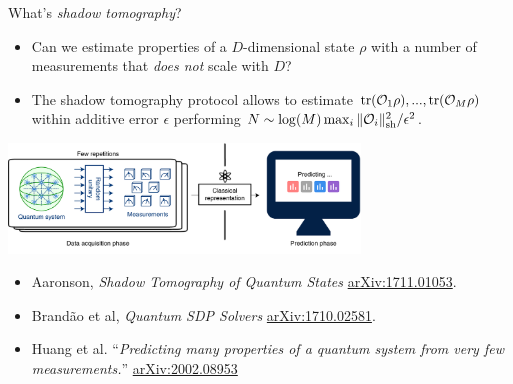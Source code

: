 \documentclass{beamer}
\begin{document}
\begin{frame}{What's \textit{shadow tomography}?}

    \begin{itemize}\small\setlength\itemsep{1em}
        \item \colorbox{orange!20}{\parbox[t]{\dimexpr\linewidth-2\fboxsep}{%
        Can we estimate properties of a $D$-dimensional state $\rho$ with a number of measurements that \textit{does not} scale with $D$?}}
        \item {\color{green!45!black} The shadow tomography protocol allows to estimate $\trace(\mathcal O_1\rho),...,\trace(\mathcal O_M\rho)$ within additive error $\epsilon$ performing $N\sim \log(M) \max_i \|\mathcal O_i\|_{\rm sh}^2/\epsilon^2$.}
    \end{itemize}

    \begin{center}
    \includegraphics[width=0.7\textwidth]{figures/shadowtomographyscheme_concise.png}
    \end{center}
    \vspace{1cm}
    \begin{itemize}\scriptsize
        \item Aaronson, \textit{Shadow Tomography of Quantum States} \href{https://arxiv.org/abs/1711.01053}{arXiv:1711.01053}.
        \item
        Brandão et al, \textit{Quantum SDP Solvers}
        \href{https://arxiv.org/abs/1710.02581}{arXiv:1710.02581}.
        \item Huang et al. ``\textit{Predicting many properties of a quantum system from very few measurements.}'' \href{https://arxiv.org/abs/2002.08953}{arXiv:2002.08953}
    \end{itemize}
    

\end{frame}
\end{document}
